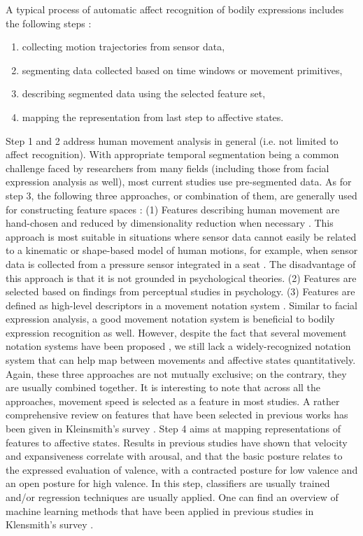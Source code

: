 A typical process of automatic affect recognition of bodily expressions includes the following steps \cite{karg2013body}:
\begin{enumerate}
\item collecting motion trajectories from sensor data,
\item segmenting data collected based on time windows or movement primitives,
\item describing segmented data using the selected feature set,
\item mapping the representation from last step to affective states.
\end{enumerate}
Step 1 and 2 address human movement analysis in general (i.e. not limited to affect recognition). With appropriate temporal segmentation being a common challenge faced by researchers from many fields (including those from facial expression analysis as well), most current studies use pre-segmented data. As for step 3, the following three approaches, or combination of them, are generally used for constructing feature spaces \cite{karg2013body}: (1) Features describing human movement are hand-chosen and reduced by dimensionality reduction when necessary \cite{nicolaou2011continuous}. This approach is most suitable in situations where sensor data cannot easily be related to a kinematic or shape-based model of human motions, for example, when sensor data is collected from a pressure sensor integrated in a seat \cite{d2009automatic}. The disadvantage of this approach is that it is not grounded in psychological theories. (2) Features are selected based on findings from perceptual studies in psychology. (3) Features are defined as high-level descriptors in a movement notation system \cite{castellano2007recognising}. Similar to facial expression analysis, a good movement notation system is beneficial to bodily expression recognition as well. However, despite the fact that several movement notation systems have been proposed \cite{birdwhistell2011kinesics}, we still lack a widely-recognized notation system that can help map between movements and affective states quantitatively. Again, these three approaches are not mutually exclusive; on the contrary, they are usually combined together. It is interesting to note that across all the approaches, movement speed is selected as a feature in most studies. A rather comprehensive review on features that have been selected in previous works has been given in Kleinsmith's survey \cite{kleinsmith2013affective}. 
Step 4 aims at mapping representations of features to affective states. Results in previous studies \cite{beck2010interpretation} have shown that velocity and expansiveness correlate with arousal, and that the basic posture relates to the expressed evaluation of valence, with a contracted posture for low valence and an open posture for high valence. In this step, classifiers are usually trained and/or regression techniques are usually applied. One can find an overview of machine learning methods that have been applied in previous studies in Klensmith's survey \cite{kleinsmith2013affective}.

